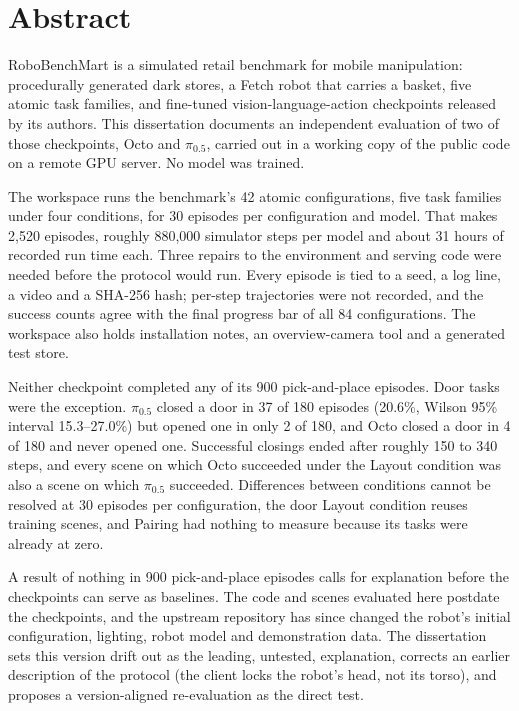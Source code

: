 \chapter*{Abstract}
\begingroup
\justifying
\setlength{\parindent}{2em}
\setlength{\parskip}{0.55\baselineskip}

RoboBenchMart is a simulated retail benchmark for mobile manipulation: procedurally generated dark stores, a Fetch robot that carries a basket, five atomic task families, and fine-tuned vision-language-action checkpoints released by its authors. This dissertation documents an independent evaluation of two of those checkpoints, Octo and $\pi_{0.5}$, carried out in a working copy of the public code on a remote GPU server. No model was trained.

The workspace runs the benchmark's 42 atomic configurations, five task families under four conditions, for 30 episodes per configuration and model. That makes 2,520 episodes, roughly 880,000 simulator steps per model and about 31 hours of recorded run time each. Three repairs to the environment and serving code were needed before the protocol would run. Every episode is tied to a seed, a log line, a video and a SHA-256 hash; per-step trajectories were not recorded, and the success counts agree with the final progress bar of all 84 configurations. The workspace also holds installation notes, an overview-camera tool and a generated test store.

Neither checkpoint completed any of its 900 pick-and-place episodes. Door tasks were the exception. $\pi_{0.5}$ closed a door in 37 of 180 episodes (20.6\%, Wilson 95\% interval 15.3--27.0\%) but opened one in only 2 of 180, and Octo closed a door in 4 of 180 and never opened one. Successful closings ended after roughly 150 to 340 steps, and every scene on which Octo succeeded under the Layout condition was also a scene on which $\pi_{0.5}$ succeeded. Differences between conditions cannot be resolved at 30 episodes per configuration, the door Layout condition reuses training scenes, and Pairing had nothing to measure because its tasks were already at zero.

A result of nothing in 900 pick-and-place episodes calls for explanation before the checkpoints can serve as baselines. The code and scenes evaluated here postdate the checkpoints, and the upstream repository has since changed the robot's initial configuration, lighting, robot model and demonstration data. The dissertation sets this version drift out as the leading, untested, explanation, corrects an earlier description of the protocol (the client locks the robot's head, not its torso), and proposes a version-aligned re-evaluation as the direct test.

\endgroup
